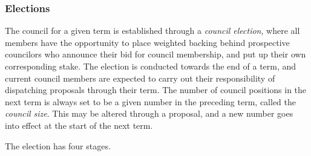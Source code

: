 \documentclass{article}
\begin{document}
\subsubsection{Elections}

The council for a given term is established through a \textit{council election}, where all members have the opportunity to place weighted backing behind prospective councilors who announce their bid for council membership, and put up their own corresponding stake. The election is conducted towards the end of a term, and current council members are expected to carry out their responsibility of dispatching proposals through their term. The number of council positions in the next term is always set to be a given number in the preceding term, called the \textit{council size}. This may be altered through a proposal, and a new number goes into effect at the start of the next term.

The election has four stages.
\end{document}

